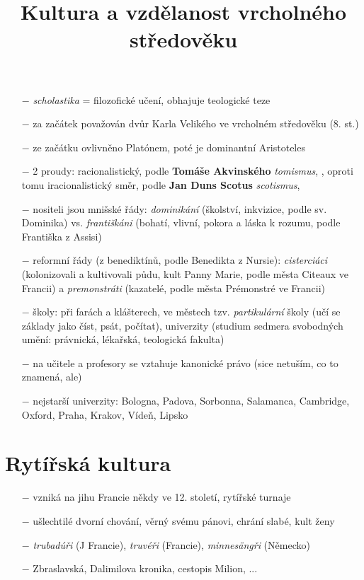\documentclass{article}
\title{\vspace{-2cm}Kultura a vzdělanost vrcholného středověku\vspace{-1.7cm}}
\date{}
\author{}
\begin{document}
\maketitle

\begin{itemize}
    \vspace{-0.5em}
    \setlength\itemsep{0.15em}
    \item[$-$] \textit{scholastika} = filozofické učení, obhajuje teologické teze
    \item[$-$] za začátek považován dvůr Karla Velikého ve vrcholném středověku (8. st.)
    \item[$-$] ze začátku ovlivněno Platónem, poté je dominantní Aristoteles
    \item[$-$] 2 proudy: racionalistický, podle \textbf{Tomáše Akvinského} \textit{tomismus}, , oproti tomu iracionalistický směr, podle \textbf{Jan Duns Scotus} \textit{scotismus}, 
    \item[$-$] nositeli jsou mnišské řády: \textit{dominikání} (školství, inkvizice, podle sv. Dominika) vs. \textit{františkáni} (bohatí, vlivní, pokora a láska k rozumu, podle Františka z Assisi)
    \item[$-$] reformní řády (z benediktínů, podle Benedikta z Nursie): \textit{cisterciáci} (kolonizovali a kultivovali půdu, kult Panny Marie, podle města Citeaux ve Francii) a \textit{premonstráti} (kazatelé, podle města Prémonstré ve Francii)
    \item[$-$] školy: při farách a klášterech, ve městech tzv. \textit{partikulární} školy (učí se základy jako číst, psát, počítat), univerzity (studium sedmera svobodných umění: právnická, lékařská, teologická fakulta)
    \item[$-$] na učitele a profesory se vztahuje kanonické právo (sice netuším, co to znamená, ale)
    \item[$-$] nejstarší univerzity: Bologna, Padova, Sorbonna, Salamanca, Cambridge, Oxford, Praha, Krakov, Vídeň, Lipsko
\end{itemize}

\section*{Rytířská kultura}
\begin{itemize}
    \vspace{-0.5em}
    \setlength\itemsep{0.15em}
    \item[$-$] vzniká na jihu Francie někdy ve 12. století, rytířské turnaje
    \item[$-$] ušlechtilé dvorní chování, věrný svému pánovi, chrání slabé, kult ženy
    \item[$-$] \textit{trubadúři} (J Francie), \textit{truvéři} (Francie), \textit{minnesängři} (Německo)
    \item[$-$] Zbraslavská, Dalimilova kronika, cestopis Milion, ...
\end{itemize}
\end{document}
